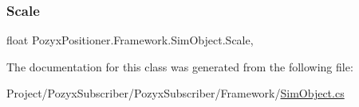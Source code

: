 \subsubsection{\texorpdfstring{Scale}{Scale}}
{\footnotesize\ttfamily float Pozyx\+Positioner.\+Framework.\+Sim\+Object.\+Scale\hspace{0.3cm}{\ttfamily [get]}, {\ttfamily [set]}}



The documentation for this class was generated from the following file\+:\begin{DoxyCompactItemize}
\item 
Project/\+Pozyx\+Subscriber/\+Pozyx\+Subscriber/\+Framework/\hyperlink{_sim_object_8cs}{Sim\+Object.\+cs}\end{DoxyCompactItemize}

